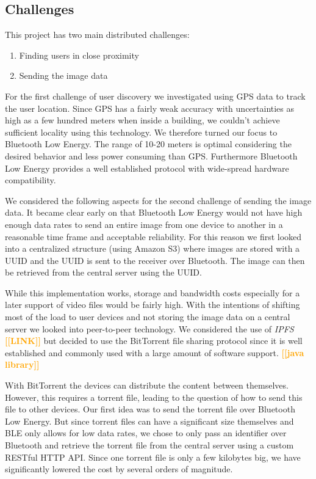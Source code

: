 \documentclass{report}
\newcommand{\todo}[1]{\textsf{\textbf{\textcolor{orange}{[[#1]]}}}}
\begin{document}
\subsection{Challenges}
This project has two main distributed challenges:
\begin{enumerate} 
    \item Finding users in close proximity
    \item Sending the image data
\end{enumerate}

For the first challenge of user discovery we investigated using GPS data to track the user location. Since GPS has a fairly weak accuracy with uncertainties as high as a few hundred meters when inside a building, we couldn't achieve sufficient locality using this technology. We therefore turned our focus to Bluetooth Low Energy. The range of 10-20 meters is optimal considering the desired behavior and less power consuming than GPS. Furthermore Bluetooth Low Energy provides a well established protocol with wide-spread hardware compatibility.

We considered the following aspects for the second challenge of sending the image data.
It became clear early on that Bluetooth Low Energy would not have high enough data rates to send an entire image from one device to another in a reasonable time frame and acceptable reliability. For this reason we first looked into a centralized structure (using Amazon S3) where images are stored with a UUID and the UUID is sent to the receiver over Bluetooth. The image can then be retrieved from the central server using the UUID.

While this implementation works, storage and bandwidth costs especially for a later support of video files would be fairly high. With the intentions of shifting most of the load to user devices and not storing the image data on a central server we looked into peer-to-peer technology. We considered the use of \textit{IPFS} \todo{LINK} but decided to use the BitTorrent file sharing protocol since it is well established and commonly used with a large amount of software support. \todo{java library} 

With BitTorrent the devices can distribute the content between themselves. However, this requires a torrent file, leading to the question of how to send this file to other devices. Our first idea was to send the torrent file over Bluetooth Low Energy. But since torrent files can have a significant size themselves and BLE only allows for low data rates, we chose to only pass an identifier over Bluetooth and retrieve the torrent file from the central server using a custom RESTful HTTP API. Since one torrent file is only a few kilobytes big, we have significantly lowered the cost by several orders of magnitude.
\end{document}
